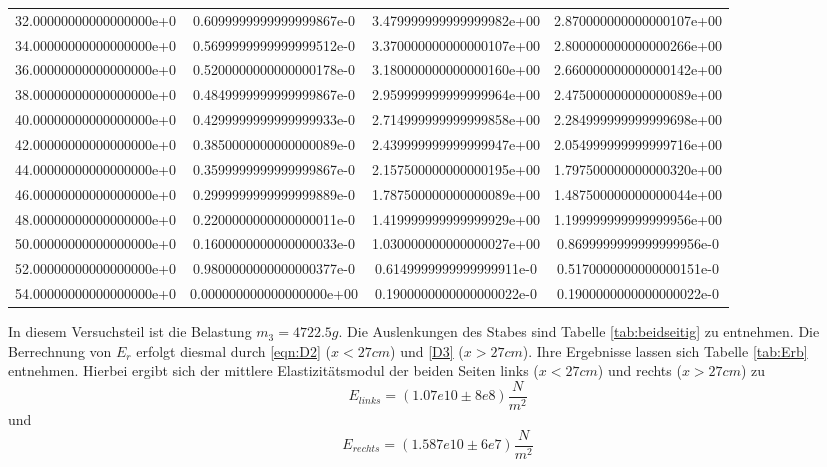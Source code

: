 \begin{table}
\begin{tabular}{S S S S}
    32.00000000000000000e+0 & 0.6099999999999999867e-0 & 3.479999999999999982e+00 & 2.870000000000000107e+00\\
    34.00000000000000000e+0 & 0.5699999999999999512e-0 & 3.370000000000000107e+00 & 2.800000000000000266e+00\\
    36.00000000000000000e+0 & 0.5200000000000000178e-0 & 3.180000000000000160e+00 & 2.660000000000000142e+00\\
    38.00000000000000000e+0 & 0.4849999999999999867e-0 & 2.959999999999999964e+00 & 2.475000000000000089e+00\\
    40.00000000000000000e+0 & 0.4299999999999999933e-0 & 2.714999999999999858e+00 & 2.284999999999999698e+00\\
    42.00000000000000000e+0 & 0.3850000000000000089e-0 & 2.439999999999999947e+00 & 2.054999999999999716e+00\\
    44.00000000000000000e+0 & 0.3599999999999999867e-0 & 2.157500000000000195e+00 & 1.797500000000000320e+00\\
    46.00000000000000000e+0 & 0.2999999999999999889e-0 & 1.787500000000000089e+00 & 1.487500000000000044e+00\\
    48.00000000000000000e+0 & 0.2200000000000000011e-0 & 1.419999999999999929e+00 & 1.199999999999999956e+00\\
    50.00000000000000000e+0 & 0.1600000000000000033e-0 & 1.030000000000000027e+00 & 0.8699999999999999956e-0\\
    52.00000000000000000e+0 & 0.9800000000000000377e-0 & 0.6149999999999999911e-0 & 0.5170000000000000151e-0\\
    54.00000000000000000e+0 & 0.000000000000000000e+00 & 0.1900000000000000022e-0 & 0.1900000000000000022e-0\\
    \bottomrule
  \end{tabular}
\end{table}

In diesem Versuchsteil ist die Belastung $m_3 = 4722.5g$. Die Auslenkungen des Stabes sind Tabelle \ref{tab:beidseitig} zu entnehmen. Die Berrechnung von $E_r$ erfolgt diesmal durch \eqref{eqn:D2} ($x<27cm$) und \eqref{D3} ($x>27cm$). Ihre Ergebnisse lassen sich Tabelle \ref{tab:Erb} entnehmen. Hierbei ergibt sich der mittlere Elastizitätsmodul der beiden Seiten links ($x<27cm$) und rechts ($x>27cm$) zu
\begin{equation*}
  E_{links} = \left(1.07e10 \pm 8e8 \right)\frac{N}{m^2}
\end{equation*}
und
\begin{equation*}
  E_{rechts} = \left(1.587e10 \pm 6e7 \right) \frac{N}{m^2}
\end{equation*}

